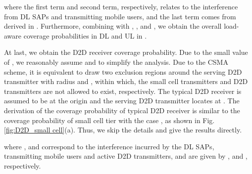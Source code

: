 \documentclass[twocolumn,english]{IEEEtran}
\theoremstyle{plain}
\theoremstyle{definition}
\begin{document}
where the first term and second term, respectively, relates to the
interference from DL SAPs and transmitting mobile users, and the last
term comes from  derived in .
Furthermore, combining  with ,
,  and
, we obtain the overall load-aware
coverage probabilities in DL and UL in .

At last, we obtain the D2D receiver coverage probability. Due to the
small value of , we reasonably assume 
and  to simplify the analysis.
Due to the CSMA scheme, it is equivalent to draw two exclusion regions
around the serving D2D transmitter with radius 
and , within which, the small cell transmitters
and D2D transmitters are not allowed to exist, respectively. The typical
D2D receiver is assumed to be at the origin and the serving D2D transmitter
locates at . The derivation of the coverage probability of
typical D2D receiver is similar to the coverage probability of small
cell tier with the case ,
as shown in Fig. \ref{fig:D2D_small cell}(a). Thus, we skip the details
and give the results directly.

where , 
and  correspond to
the interference incurred by the DL SAPs, transmitting mobile users
and active D2D transmitters, and are given by ,
 and , respectively.



\end{document}
